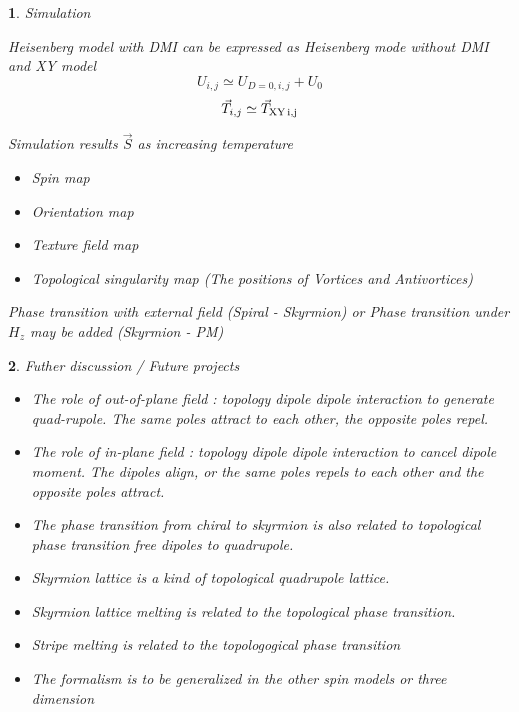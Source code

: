 \documentclass[12pt]{article}
\theoremstyle{problemstyle}
\newtheorem{problem}{}
\begin{document}
\begin{problem} Simulation
    
        Heisenberg model with DMI can be expressed as Heisenberg mode without DMI and XY model 
        \begin{equation}
            U_{i,j} \simeq U_{D=0,i,j} + U_0
        \end{equation}
        \begin{equation}
            \vec{T}_{i,j} \simeq \vec{T}_{\rm{XY}\,i,j}
        \end{equation}

    Simulation results $\vec{S}$ as increasing temperature
    \begin{itemize}
        \item Spin map
        \item Orientation map
        \item Texture field map 
        \item Topological singularity map (The positions of Vortices and Antivortices)
        
    \end{itemize}

    Phase transition with external field (Spiral - Skyrmion) or Phase transition under $H_z$ may be added (Skyrmion - PM)
\end{problem}

\begin{problem} Futher discussion / Future projects
    \begin{itemize}
        \item The role of out-of-plane field : topology dipole dipole interaction to generate quad-rupole. The same poles attract to each other, the opposite poles repel.
        \item The role of in-plane field : topology dipole dipole interaction to cancel dipole moment. The dipoles align, or the same poles repels to each other and the opposite poles attract.
        \item The phase transition from chiral to skyrmion is also related to topological phase transition free dipoles to quadrupole.
        \item Skyrmion lattice is a kind of topological quadrupole lattice.
        \item Skyrmion lattice melting is related to the topological phase transition.
        \item Stripe melting is related to the topologogical phase transition
        \item The formalism is to be generalized in the other spin models or three dimension
    \end{itemize}
\end{problem}
\end{document}
